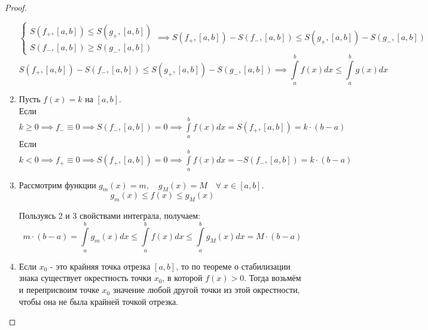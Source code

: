 \documentclass[../main.tex]{subfiles}
\begin{document}
\begin{proof}
\begin{enumerate}
\begin{equation*}
        \end{equation*}
        \begin{equation*}
            \begin{cases}
                S\left( f_+, \left[ a,b\right]\right) \leq S\left( g_+, \left[ a,b\right]\right)\\
                S\left( f_-, \left[ a,b\right]\right) \geq S\left( g_-, \left[ a,b\right]\right)
            \end{cases}
            \implies
            S\left( f_+,\left[ a,b\right]\right)-S\left( f_-,\left[ a,b\right]\right) \leq S\left( g_+, \left[ a,b\right]\right)-S\left( g_-,\left[ a,b\right]\right)
        \end{equation*}
        \[S\left( f_+,\left[ a,b\right]\right)-S\left( f_-,\left[ a,b\right]\right) \leq S\left( g_+, \left[ a,b\right]\right)-S\left( g_-,\left[ a,b\right]\right) \implies \displaystyle\int\limits_{ a}^{ b} f\left( x\right)dx \leq \displaystyle\int\limits_{ a}^{ b} g \left( x\right)dx\]
        \item Пусть \( f\left( x\right)=k\) на \( \left[ a,b\right]\). \\
        Если \( k \geq 0 \implies f_-\equiv 0 \implies S\left( f_-,\left[ a,b\right]\right)=0 \implies \displaystyle\int\limits_{ a}^{ b} f\left( x\right)dx=S\left( f_+,\left[ a,b\right]\right)=k \cdot \left( b-a\right)\)\\
        Если \( k < 0 \implies f_+\equiv 0 \implies S\left( f_+,\left[ a,b\right]\right)=0 \implies \displaystyle\int\limits_{ a}^{ b} f\left( x\right)dx=-S\left( f_-,\left[ a,b\right]\right)=k \cdot \left( b-a\right)\)
        \item Рассмотрим функции \( g_m\left( x\right)=m,\quad g_M\left( x\right)=M\quad \forall \; x \in [a,b]\).
        \[ g_m\left( x\right) \leq f\left( x\right) \leq g_M\left( x\right)\]
        \par Пользуясь 2 и 3 свойствами интеграла, получаем:
        \[ m \cdot \left( b-a\right) = \displaystyle\int\limits_{ a}^{ b} g_m\left( x\right)dx \leq \displaystyle\int\limits_{ a}^{ b} f\left( x\right)dx \leq \displaystyle\int\limits_{ a}^{ b} g_M\left( x\right)dx=M \cdot \left( b-a\right)\]
        \item Если \( x_0\) - это крайняя точка отрезка \( \left[ a,b\right]\), то по теореме о стабилизации знака существует окрестность точки \( x_0\), в которой \(f\left( x\right) >0\). Тогда возьмём и переприсвоим точке \( x_0\) значение любой другой точки из этой окрестности, чтобы она не была крайней точкой отрезка. 

\end{enumerate}
\end{proof}
\end{document}
